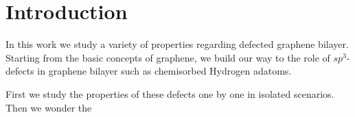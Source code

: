 \chapter{Introduction}
In this work we study a variety of properties regarding defected graphene bilayer. Starting from the basic concepts of graphene, we build our way to the role of $sp^3$-defects in graphene bilayer such as chemisorbed Hydrogen adatoms.

First we study the properties of these defects one by one in isolated scenarios. Then we wonder the 
